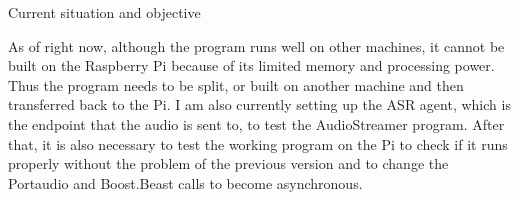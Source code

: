 Current situation and objective

As of right now, although the program runs well on other machines, it cannot be
built on the Raspberry Pi because of its limited memory and processing power.
Thus the program needs to be split, or built on another machine and then
transferred back to the Pi. I am also currently setting up the ASR agent, which
is the endpoint that the audio is sent to, to test the AudioStreamer program.
After that, it is also necessary to test the working program on the Pi to check
if it runs properly without the problem of the previous version and to change
the Portaudio and Boost.Beast calls to become asynchronous.
